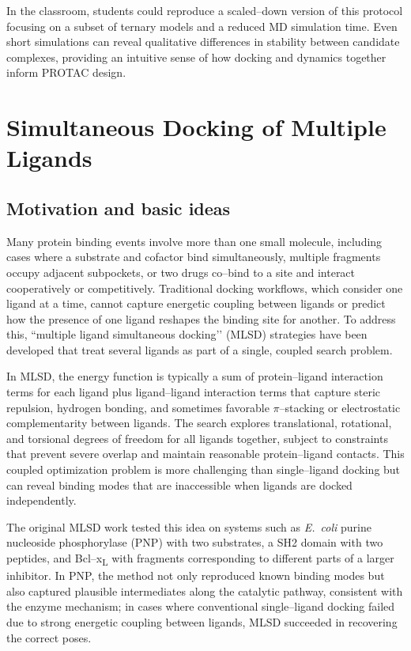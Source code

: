 \documentclass[12pt]{article}
\begin{document}
In the classroom, students could reproduce a scaled–down version of this protocol focusing on a subset of ternary models and a reduced MD simulation time.  
Even short simulations can reveal qualitative differences in stability between candidate complexes, providing an intuitive sense of how docking and dynamics together inform PROTAC design.

\section{Simultaneous Docking of Multiple Ligands}

\subsection{Motivation and basic ideas}

Many protein binding events involve more than one small molecule, including cases where a substrate and cofactor bind simultaneously, multiple fragments occupy adjacent subpockets, or two drugs co–bind to a site and interact cooperatively or competitively.  
Traditional docking workflows, which consider one ligand at a time, cannot capture energetic coupling between ligands or predict how the presence of one ligand reshapes the binding site for another.  
To address this, “multiple ligand simultaneous docking’’ (MLSD) strategies have been developed that treat several ligands as part of a single, coupled search problem.\cite{CH14_MLSD2010}

In MLSD, the energy function is typically a sum of protein–ligand interaction terms for each ligand plus ligand–ligand interaction terms that capture steric repulsion, hydrogen bonding, and sometimes favorable \(\pi\)–stacking or electrostatic complementarity between ligands.  
The search explores translational, rotational, and torsional degrees of freedom for all ligands together, subject to constraints that prevent severe overlap and maintain reasonable protein–ligand contacts.\cite{CH14_MLSD2010} 
This coupled optimization problem is more challenging than single–ligand docking but can reveal binding modes that are inaccessible when ligands are docked independently.

The original MLSD work tested this idea on systems such as \emph{E.~coli} purine nucleoside phosphorylase (PNP) with two substrates, a SH2 domain with two peptides, and Bcl–x\textsubscript{L} with fragments corresponding to different parts of a larger inhibitor. 
In PNP, the method not only reproduced known binding modes but also captured plausible intermediates along the catalytic pathway, consistent with the enzyme mechanism; in cases where conventional single–ligand docking failed due to strong energetic coupling between ligands, MLSD succeeded in recovering the correct poses.\cite{CH14_MLSD2010}
\end{document}
